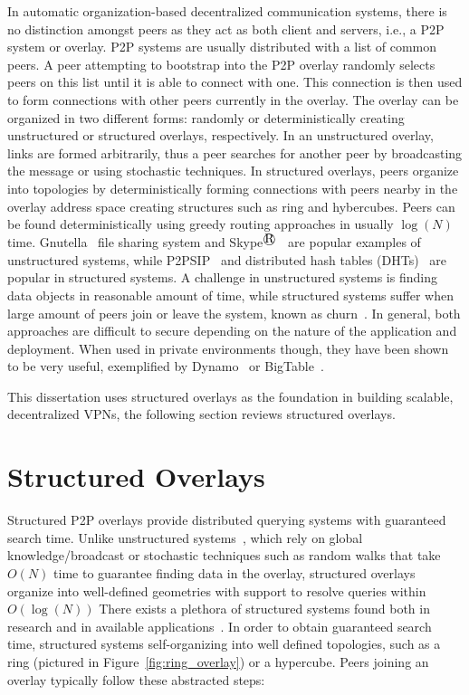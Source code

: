 In automatic organization-based decentralized communication systems, there is
no distinction amongst peers as they act as both client and servers, i.e., a
P2P system or overlay.  P2P systems are usually distributed with a list of
common peers.  A peer attempting to bootstrap into the P2P overlay randomly
selects peers on this list until it is able to connect with one.  This
connection is then used to form connections with other peers currently in the
overlay.  The overlay can be organized in two different forms: randomly or
deterministically creating unstructured or structured overlays, respectively.
In an unstructured overlay, links are formed arbitrarily, thus a peer searches
for another peer by broadcasting the message or using stochastic techniques.
In structured overlays, peers organize into topologies by deterministically
forming connections with peers nearby in the overlay address space creating
structures such as ring and hybercubes.  Peers can be found deterministically
using greedy routing approaches in usually $\log(N)$ time.
Gnutella~\cite{gnutella} file sharing system and Skype$^\registered$~\cite{skype} are popular
examples of unstructured systems, while P2PSIP~\cite{p2psip} and distributed
hash tables (DHTs)~\cite{chord} are popular in structured systems.  A challenge
in unstructured systems is finding data objects in reasonable amount of time,
while structured systems suffer when large amount of peers join or leave the
system, known as churn~\cite{opendht}.  In general, both approaches are
difficult to secure depending on the nature of the application and deployment.
When used in private environments though, they have been shown to be very
useful, exemplified by Dynamo~\cite{dynamo} or BigTable~\cite{bigtable}.

This dissertation uses structured overlays as the foundation in building
scalable, decentralized VPNs, the following section reviews structured
overlays.

\section{Structured Overlays}

Structured P2P overlays provide distributed querying systems with guaranteed
search time.  Unlike unstructured systems~\cite{unstructured_v_structured},
which rely on global knowledge/broadcast or stochastic techniques such as
random walks that take $O(N)$ time to guarantee finding data in the overlay,
structured overlays organize into well-defined geometries with support to
resolve queries within $O(\log(N))$ There exists a plethora of structured
systems found both in research and in available applications~\cite{pastry,
chord, symphony, kademlia, can, brunet}.  In order to obtain guaranteed search
time, structured systems self-organizing into well defined topologies, such as
a ring (pictured in Figure~\ref{fig:ring_overlay}) or a hypercube.  Peers
joining an overlay typically follow these abstracted steps:

